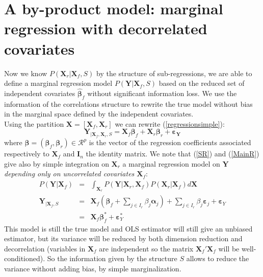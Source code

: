 \documentclass[12pt,a4paper]{report}
\begin{document}
\section{A by-product model: marginal regression with decorrelated covariates}
Now we know $P(\boldsymbol{X}_r|\boldsymbol{X}_f,S)$ by the structure of sub-regressions, we are able to define a marginal regression model $P(\boldsymbol{Y}|\boldsymbol{X}_f,S)$ based on the reduced set of independent covariates $\hat{\boldsymbol{\beta}}_f$ without significant information loss. We use the information of the correlations structure to rewrite the true model without bias in the marginal space defined by the independent covariates.
 	\\
Using the partition $\boldsymbol{X}=[\boldsymbol{X}_f,\boldsymbol{X}_r]$ we can rewrite (\ref{regressionsimple}):
	\begin{equation}
			\boldsymbol{Y}_{|\boldsymbol{X}_f,\boldsymbol{X}_r,S}=\boldsymbol{X}_f\boldsymbol{\beta}_f+\boldsymbol{X}_r\boldsymbol{\beta}_r+\boldsymbol{\varepsilon_Y} \label{MainR}
		\end{equation}
		where $\boldsymbol{\beta}=(\boldsymbol{\beta}_f,\boldsymbol{\beta}_r) \in  \mathcal{R}^p$ is the vector of the regression coefficients associated respectively to $\boldsymbol{X}_f$ and $\boldsymbol{I}_n$ the identity matrix. 
We note that (\ref{SR}) and (\ref{MainR}) give also by simple integration on $\boldsymbol{X}_r$ a marginal regression model on $\boldsymbol{Y}$ {\it depending only on uncorrelated covariates $\boldsymbol{X}_f$}:
\begin{eqnarray}
		P(\boldsymbol{Y}|\boldsymbol{X}_f)&=& \int_{\boldsymbol{X}_r}P(\boldsymbol{Y}|\boldsymbol{X}_r,\boldsymbol{X}_f)P(\boldsymbol{X}_r|\boldsymbol{X}_f) d \boldsymbol{X} \\
	\boldsymbol{Y}_{|\boldsymbol{X}_f,S}&=&\boldsymbol{X}_f (\boldsymbol{\beta}_f+ \sum_{j \in I_r}\beta_{j}\boldsymbol{\alpha}_j)+  \sum_{j \in I_r}\beta_{j}\boldsymbol{\varepsilon}_j+\boldsymbol{\varepsilon}_Y \label{Trueexpl} \\
	&=&\boldsymbol{X}_f\boldsymbol{\beta}_f^*+\boldsymbol{\varepsilon}_Y^*\label{modexpl}
\end{eqnarray}
 This model is still the true model and OLS estimator will still give an unbiased estimator, but its variance will be reduced by both dimension reduction and decorrelation (variables in $\boldsymbol{X}_f$ are independent so the matrix $\boldsymbol{X}_f'\boldsymbol{X}_f$ will be well-conditioned). So the information given by the structure $S$ allows to reduce the variance without adding bias, by simple marginalization.
\end{document}
